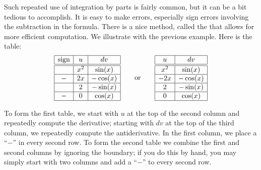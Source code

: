 \documentclass{ximera}
\begin{document}
Such repeated use of integration by parts is fairly common, but it can
be a bit tedious to accomplish.  It is easy to make
errors, especially sign errors involving the subtraction in the
formula. There is a nice method, called the  that allows for more efficient computation.  We illustrate with the previous example. Here is the table:
\[
\begin{array}{|c|c|c|}\hline
\text{sign} & u & dv \\ \hline \hline
 & x^2 & \sin(x) \\ \hline
- & 2x & -\cos(x) \\ \hline
  & 2  & -\sin(x) \\ \hline
- & 0  & \cos(x) \\ \hline
\end{array}
\qquad\text{or}\qquad
\begin{array}{|c|c|}\hline
u & dv \\ \hline\hline
x^2 & \sin(x) \\ \hline 
-2x & -\cos(x) \\\hline
2 & -\sin(x)\\\hline
0 & \cos(x)\\\hline
\end{array}
\]

To form the first table, we start with $u$ at the top of the second
column and repeatedly compute the derivative; starting with $dv$ at
the top of the third column, we repeatedly compute the
antiderivative. In the first column, we place a ``$-$'' in every
second row. To form the second table we combine the first and second
columns by ignoring the boundary; if you do this by hand, you may
simply start with two columns and add a ``$-$'' to every second row.
\end{document}
